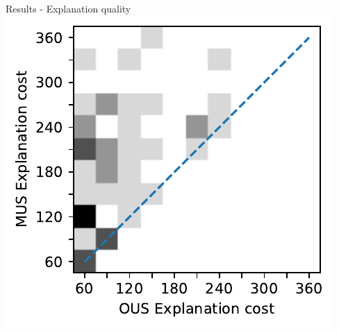 \documentclass{beamer}
\begin{document}
\begin{frame}{Results - Explanation quality}
	\centering
	\includegraphics[width=0.6\columnwidth]{figures/rq1_heatmap.pdf}
	
\end{frame}




%
%	
%	
%
%	
%	
\end{document}
